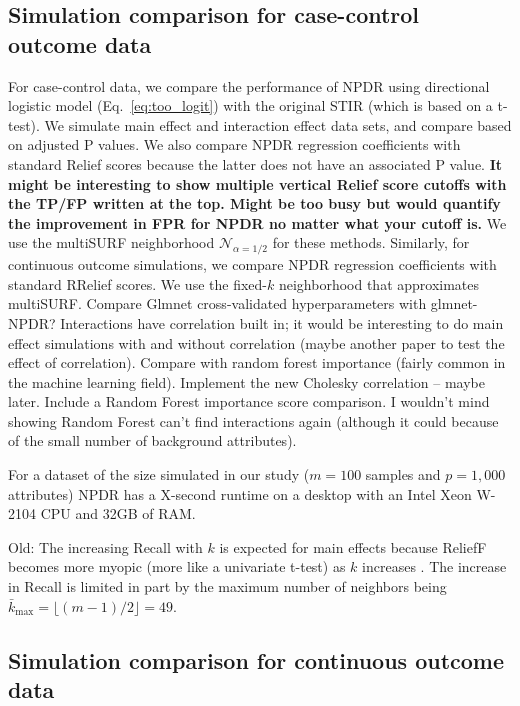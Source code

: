\documentclass[10pt]{article}
\begin{document}
\subsection{Simulation comparison for case-control outcome data} 
For case-control data, we compare the performance of NPDR using directional logistic model (Eq.~\ref{eq:too_logit}) with the original STIR (which is based on a t-test). We simulate main effect and interaction effect data sets, and compare based on adjusted P values. We also compare NPDR regression coefficients with standard Relief scores because the latter does not have an associated P value. {\bf It might be interesting to show multiple vertical Relief score cutoffs with the TP/FP written at the top. Might be too busy but would quantify the improvement in FPR for NPDR no matter what your cutoff is.} We use the multiSURF neighborhood $\mathcal{N}_{\alpha=1/2}$ for these methods. Similarly, for continuous outcome simulations, we compare NPDR regression coefficients with standard RRelief scores. We use the fixed-$k$ neighborhood that approximates multiSURF.  Compare Glmnet cross-validated hyperparameters with glmnet-NPDR? Interactions have correlation built in; it would be interesting to do main effect simulations with and without correlation (maybe another paper to test the effect of correlation). Compare with random forest importance (fairly common in the machine learning field). Implement the new Cholesky correlation -- maybe later. Include a Random Forest importance score comparison. I wouldn't mind showing Random Forest can't find interactions again (although it could because of the small number of background attributes). 

For a dataset of the size simulated in our study ($m=100$ samples and $p=1,000$ attributes) NPDR has a X-second runtime on a desktop with an Intel Xeon W-2104 CPU and 32GB of RAM. 

Old: The increasing Recall with $k$ is expected for main effects because ReliefF becomes more myopic (more like a univariate t-test) as $k$ increases \cite{robnik03,mckinney13}. The increase in Recall is limited in part by the maximum number of neighbors being $\bar{k}_{\max{}} =\lfloor (m-1)/2\rfloor=49$. 

\subsection{Simulation comparison for continuous outcome data} 
\end{document}
